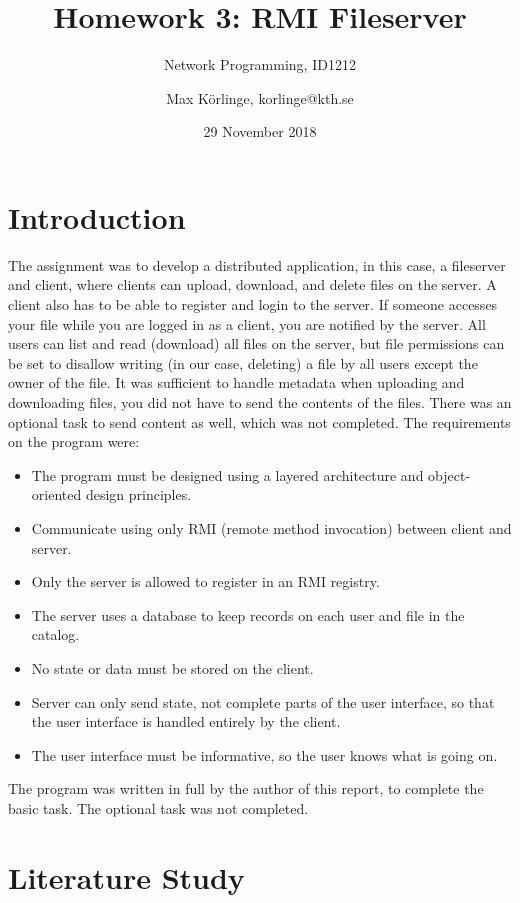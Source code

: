 \documentclass[a4paper]{scrartcl}
\title{Homework 3: RMI Fileserver}
\subtitle{Network Programming, ID1212}
\author{Max Körlinge, korlinge@kth.se}
\date{29 November 2018}
\begin{document}
\maketitle


\section{Introduction}

\noindent The assignment was to develop a distributed application, in this case, a fileserver and client, where clients can upload, download, and delete files on the server. A client also has to be able to register and login to the server. If someone accesses your file while you are logged in as a client, you are notified by the server. All users can list and read (download) all files on the server, but file permissions can be set to disallow writing (in our case, deleting) a file by all users except the owner of the file. It was sufficient to handle metadata when uploading and downloading files, you did not have to send the contents of the files. There was an optional task to send content as well, which was not completed. The requirements on the program were:

\begin{itemize}
    \item The program must be designed using a layered architecture and object-oriented design principles.
    \item Communicate using only RMI (remote method invocation) between client and server.
    \item Only the server is allowed to register in an RMI registry.
    \item The server uses a database to keep records on each user and file in the catalog.
    \item No state or data must be stored on the client.
    \item Server can only send state, not complete parts of the user interface, so that the user interface is handled entirely by the client.
    \item The user interface must be informative, so the user knows what is going on.
\end{itemize}

The program was written in full by the author of this report, to complete the basic task. The optional task was not completed.

\section{Literature Study}
\end{document}
